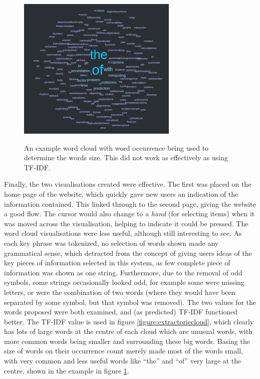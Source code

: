 \begin{figure}
	\centering
	\includegraphics{img/cloud-bad.png} \\
	\caption[The Word Clouds with Word Occurance As The Size Metric]{An example word cloud with word occurrence being used to determine the words size. This did not work as effectively as using TF-IDF.}
	\label{figure:extractoriecloud-bad}
\end{figure}

Finally, the two visualisations created were effective. The first was placed on the home page of the website, which quickly gave new users an indication of the information contained. This linked through to the second page, giving the website a good flow. The cursor would also change to a \textit{hand} (for selecting items) when it was moved across the visualisation, helping to indicate it could be pressed. The word cloud visualisations were less useful, although still interesting to see. As each key phrase was tokenized, no selection of words shown made any grammatical sense, which detracted from the concept of giving users ideas of the key pieces of information selected in this system, as few complete piece of information was shown as one string. Furthermore, due to the removal of odd symbols, some strings occasionally looked odd, for example some were missing letters, or were the combination of two words (where they would have been separated by some symbol, but that symbol was removed). The two values for the words proposed were both examined, and (as predicted) TF-IDF functioned better. The TF-IDF value is used in figure \ref{figure:extractoriecloud}, which clearly has lots of large words at the centre of each cloud which are unusual words, with more common words being smaller and surrounding these big words. Basing the size of words on their occurrence count merely made most of the words small, with very common and less useful words like ``the'' and ``of'' very large at the centre, shown in the example in figure \ref{figure:extractoriecloud-bad}.

